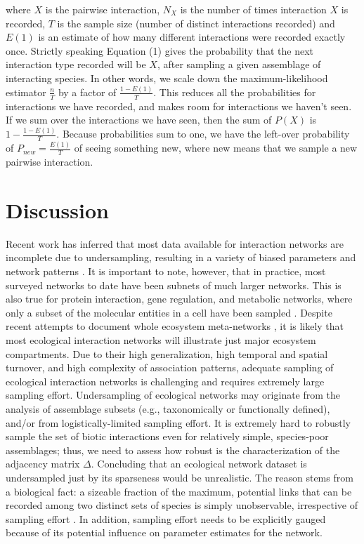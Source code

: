 \documentclass[12pt]{article}
\begin{document}
where $X$ is the pairwise interaction, $N_X$ is the number of times interaction $X$ is recorded, $T$ is the sample size (number of distinct interactions recorded) and $E(1)$ is an estimate of how many different interactions were recorded exactly once. Strictly speaking Equation (1) gives the probability that the next interaction type recorded will be $X$, after sampling a given assemblage of interacting species. In other words, we scale down the maximum-likelihood estimator $\frac{n}{T}$ by a factor of $\frac{1-E(1)}{T}$. This reduces all the probabilities for interactions we have recorded, and makes room for interactions we haven’t seen. If we sum over the interactions we have seen, then the sum of $P(X)$ is $1-\frac{1-E(1)}{T}$. Because probabilities sum to one, we have the left-over probability of
$P_{new}= \frac{E(1)}{T}$ of seeing something new, where new means that we sample a new pairwise interaction.  

\section*{Discussion}
\label{discussion}
Recent work has inferred that most data available for interaction networks are incomplete due to undersampling, resulting in a variety of biased parameters and network patterns \citep{Chacoff:2012}. It is important to note, however, that in practice, most surveyed networks to date have been subnets of much larger networks. This is also true for protein interaction, gene regulation, and metabolic networks, where only a subset of the molecular entities in a cell have been sampled \citep{Stumpf:2005tn}. Despite recent attempts to document whole ecosystem meta-networks \citep{Pocock:2012ep}, it is likely that most ecological interaction networks will illustrate just major ecosystem compartments. Due to their high generalization, high temporal and spatial turnover, and high complexity of association patterns, adequate sampling of ecological interaction networks is challenging and requires extremely large sampling effort. Undersampling of ecological networks may originate from the analysis of assemblage subsets (e.g., taxonomically or functionally defined), and\slash or from logistically-limited sampling effort. It is extremely hard to robustly sample the set of biotic interactions even for relatively simple, species-poor assemblages; thus, we need to assess how robust is the characterization of the adjacency matrix $\Delta$. Concluding that an ecological network dataset is undersampled just by its sparseness would be unrealistic. The reason stems from a biological fact: a sizeable fraction of the maximum, potential links that can be recorded among two distinct sets of species is simply unobservable, irrespective of sampling effort \citep{E31/2562}. In addition, sampling effort needs to be explicitly gauged because of its potential influence on parameter estimates for the network. 
\end{document}
